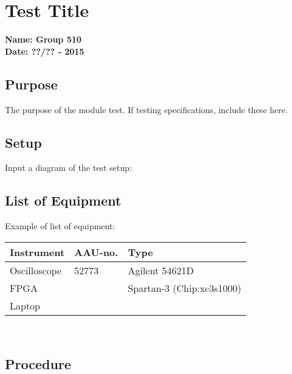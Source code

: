 \chapter{Test Title} %
\textbf{Name: Group 510}\\
\textbf{Date: ??/?? - 2015}

\section*{Purpose}
The purpose of the module test. If testing specifications, include these here.
\\

\section*{Setup}
Input a diagram of the test setup:

\section*{List of Equipment}
Example of list of equipment:
\begin{table}[H]
\begin{tabular}{|l|l|p{4cm}|}
\hline%
  \textbf{Instrument}           &  \textbf{AAU-no.}  &  \textbf{Type}    \\
\hline%
  Oscilloscope                  &  52773             &  Agilent 54621D  \\
\hline%
  FPGA							&                    &   Spartan-3 (Chip:xc3s1000)  \\
\hline%
  Laptop                        & 	                 &       \\
\hline%
\end{tabular}\\
\end{table}

\section*{Procedure}

